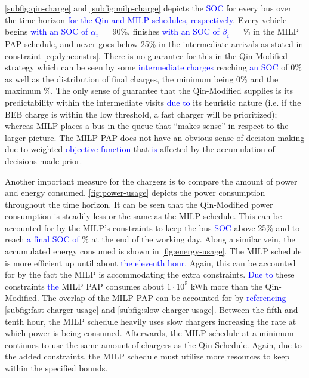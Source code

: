 \documentclass[utf8]{FrontiersinHarvard}
\newcommand{\bcharge}{0.7 }                                                     %
\newcommand{\mincharge}{25\% }                                                  %
\newcommand{\batsize}{388 }                                                     %
\begin{document}
\autoref{subfig:qin-charge} and \autoref{subfig:milp-charge} depicts the \textcolor{blue}{SOC} for every bus over the time
horizon \textcolor{blue}{for the Qin and MILP schedules, respectively}. Every vehicle begins \textcolor{blue}{with an SOC of $\alpha_i = $} 90\%, finishes \textcolor{blue}{with an SOC of $\beta_i =$} \fpeval{\bcharge *100}\% in the MILP PAP schedule, and
never goes below \mincharge in the intermediate arrivals as stated in constraint \autoref{eq:dynconstrs}. There is no
guarantee for this in the Qin-Modified strategy which can be seen by some \textcolor{blue}{intermediate charges} reaching
\textcolor{blue}{an SOC} of 0\% as well as the distribution of final charges, the minimum being 0\% and the maximum
\fpeval{trunc(\fpeval{368 / \batsize * 100}, 3)}\%. The only sense of guarantee that the Qin-Modified supplies
is its predictability within the intermediate visits \textcolor{blue}{due to} its heuristic nature (i.e. if the BEB charge
is within the low threshold, a fast charger will be prioritized); whereas MILP places a bus in the queue that ``makes
sense'' in respect to the larger picture. The MILP PAP does not have an obvious sense of decision-making due to weighted
\textcolor{blue}{objective function} that \textcolor{blue}{is} affected by the accumulation of decisions made prior.

Another important measure for the chargers is to compare the amount of power and energy consumed.
\autoref{fig:power-usage} depicts the power consumption throughout the time horizon. It can be seen that the
Qin-Modified power consumption is steadily less or the same as the MILP schedule. This can be accounted for by the
MILP's constraints to keep the bus \textcolor{blue}{SOC} above \mincharge and to reach
\textcolor{blue}{a final SOC of} \fpeval{\bcharge *100}\% at the end of the working day. Along a similar vein,
the accumulated energy consumed is shown in \autoref{fig:energy-usage}. The MILP schedule is more efficient up until
about \textcolor{blue}{the eleventh hour}. Again, this can be accounted for by the fact the MILP is
accommodating the extra constraints. \textcolor{blue}{Due to} these constraints
\textcolor{blue}{the} MILP PAP consumes about \(1\cdot10^5\) kWh more than the Qin-Modified. The overlap of the
MILP PAP can be accounted for by \textcolor{blue}{referencing} \autoref{subfig:fast-charger-usage} and
\autoref{subfig:slow-charger-usage}. Between the fifth and tenth hour, the MILP schedule heavily uses slow chargers
increasing the rate at which power is being consumed. Afterwards, the MILP schedule at a minimum continues to use the
same amount of chargers as the Qin Schedule. Again, due to the added constraints, the MILP schedule must utilize more
resources to keep within the specified bounds.
\end{document}
